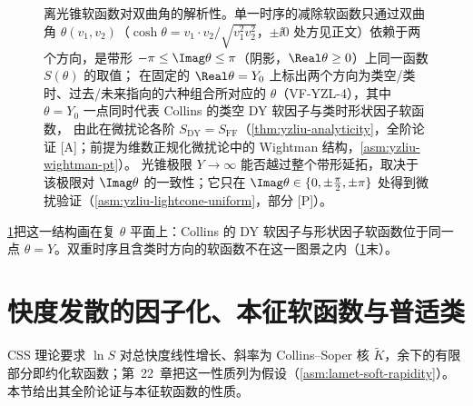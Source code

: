 \begin{figure}[htbp]
\caption{离光锥软函数对双曲角的解析性。单一时序的减除软函数只通过双曲角 $\theta(v_1,v_2)$（$\cosh\theta=v_1\cdot v_2/\sqrt{v_1^2v_2^2}$，$\pm\ii0$ 处方见正文）依赖于两个方向，是带形 $-\pi\le\Imag\theta\le\pi$（阴影，$\Real\theta\ge0$）上同一函数 $S(\theta)$ 的取值；
在固定的 $\Real\theta=Y_0$ 上标出两个方向为类空/类时、过去/未来指向的六种组合所对应的 $\theta$（VF-YZL-4），其中 $\theta=Y_0$ 一点同时代表 Collins 的类空 DY 软因子与类时形状因子软函数，
由此在微扰论各阶 $S_{\mathrm{DY}}=S_{\mathrm{FF}}$（\cref{thm:yzliu-analyticity}，全阶论证 [A]；前提为维数正规化微扰论中的 Wightman 结构，\cref{asm:yzliu-wightman-pt}）。
光锥极限 $Y\to\infty$ 能否越过整个带形延拓，取决于该极限对 $\Imag\theta$ 的一致性；它只在 $\Imag\theta\in\{0,\pm\frac{\pi}{2},\pm\pi\}$ 处得到微扰验证（\cref{asm:yzliu-lightcone-uniform}，部分 [P]）。}
\label{fig:yzliu-theta-strip}
\end{figure}

\cref{fig:yzliu-theta-strip}把这一结构画在复 $\theta$ 平面上：Collins 的 DY 软因子与形状因子软函数位于同一点 $\theta=Y$。双重时序且含类时方向的软函数不在这一图景之内（\cref{sec:yzliu-rapidity}末）。

\section{快度发散的因子化、本征软函数与普适类}\label{sec:yzliu-rapidity}

CSS 理论要求 $\ln S$ 对总快度线性增长、斜率为 Collins--Soper 核 $\tilde K$，余下的有限部分即约化软函数；第~22~章把这一性质列为假设（\cref{asm:lamet-soft-rapidity}）。本节给出其全阶论证与本征软函数的性质。

